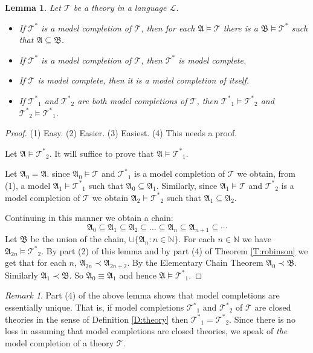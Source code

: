 \documentclass[titlepage, oneside]{amsbook}
\theoremstyle{plain}
\newtheorem{lemma}{Lemma}
\theoremstyle{definition}
\theoremstyle{remark}
\newtheorem*{rem}{Remark}
\newcommand{\theory}{\ensuremath{\mathcal{T}}}
\newcommand{\tst}{\ensuremath{\mathcal{T}^{\ast}}}
\newcommand{\tstar}{\ensuremath{\mathcal{T}^{\ast}}}
\newcommand{\lan}{\ensuremath{\mathcal{L}}}
\newcommand{\seq}{\ensuremath{\subseteq}}
\newcommand{\ma}{\ensuremath{\mathfrak{A}}}
\newcommand{\mb}{\ensuremath{\mathfrak{B}}}
\begin{document}
\begin{lemma} Let $\theory$ be a theory in a language $\lan$.
\begin{itemize}
\item[(1)] If $\tstar$ is a model completion of $\theory$, then for each
$\ma \models \theory$ there is a $\mb \models \tst$ such that $\ma
\seq \mb$.
\item[(2)] If $\tstar$ is a model completion of $\theory$, then $\tstar$
is
model complete.
\item[(3)] If $\theory$ is model complete, then it is a model completion
of itself.
\item[(4)] If $\tstar_1$ and $\tstar_2$ are both model completions of
$\theory$, then $\tstar_1 \models \tstar_2$ and $\tstar_2 \models
\tstar_1$.
\end{itemize}
\end{lemma}

\begin{proof} 
(1) Easy. 
(2) Easier. 
(3) Easiest. 
(4) This needs a proof.  

Let $\ma \models \tstar_2$.  It will suffice to prove that $\ma \models \tstar_1$.

Let $\ma_0 = \ma$.  since $\ma_0 \models \theory$ and $\tstar_1$ is a
model completion of $\theory$ we obtain, from (1), a model $\ma_1 \models
\tstar_1$ such that $\ma_0 \seq \ma_1$.  Similarly, since $\ma_1
\models
\theory$ and $\tstar_2$ is a model completion of $\theory$ we obtain
$\ma_2 \models \tstar_2$ such that $\ma_1 \seq \ma_2$.

Continuing in this manner we obtain a chain: 
\[ \ma_0 \seq \ma_1 \seq \ma_2 \seq \dots \seq \ma_n \seq \ma_{n+1} \seq
\cdots \]
Let $\mb $ be the union of the chain, $\cup \{ \ma_n : n \in \mathbb N
\}$.  For each $n \in \mathbb{N}$ we have $\ma_{2n} \models \tstar_2$.  By part (2) of this lemma and 
by part (4) of Theorem \ref{T:robinson} we get that for each $n$, $\ma_{2n} \prec \ma_{2n+2}$.
By the Elementary Chain Theorem $\ma_0 \prec \mb$.  Similarly $\ma_1 \prec
\mb$.  So $\ma_0 \equiv \ma_1$ and hence $\ma \models \tstar_1$.

\end{proof}

\begin{rem} Part (4) of the above lemma shows that model completions are
essentially unique.  That is, if model completions $\tstar_1$ and
$\tstar_2$ of $\theory$ are closed theories in the sense of Definition
\ref{D:theory} then $\tstar_1 = \tstar_2$.  Since there is no loss in
assuming that model completions are closed theories, we speak of
\emph{the} model completion of a theory $\theory$.

\end{rem}
\end{document}
